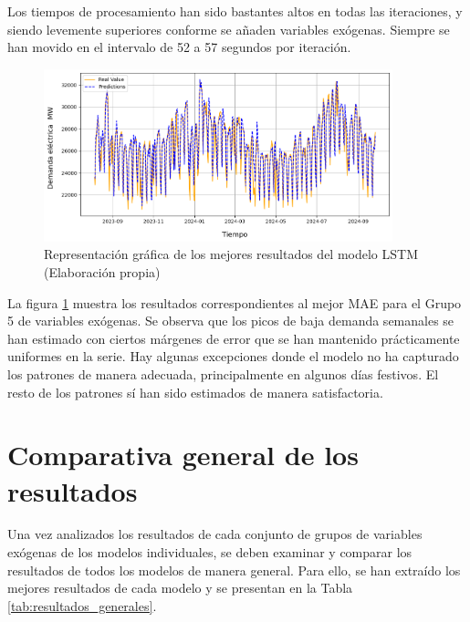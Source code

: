 \documentclass[12pt,a4paper]{report}
\begin{document}
Los tiempos de procesamiento han sido bastantes altos en todas las iteraciones, y siendo levemente superiores conforme se añaden variables exógenas. Siempre se han movido en el intervalo de 52 a 57 segundos por iteración.



\begin{figure}[H]
    \centering
    \includegraphics[width=0.9\textwidth]{Images/tfm-4.5(lstm).png}
    \caption{Representación gráfica de los mejores resultados del modelo LSTM (Elaboración propia) }
    \label{fig:figura_LSTM}
\end{figure}


La figura \ref{fig:figura_LSTM} muestra los resultados correspondientes al mejor MAE para el Grupo 5 de variables exógenas. Se observa que los picos de baja demanda semanales se han estimado con ciertos márgenes de error que se han mantenido prácticamente uniformes en la serie. Hay algunas excepciones donde el modelo no ha capturado los patrones de manera adecuada, principalmente en algunos días festivos. El resto de los patrones sí han sido estimados de manera satisfactoria.









\section{Comparativa general de los resultados}

Una vez analizados los resultados de cada conjunto de grupos de variables exógenas de los modelos individuales, se deben examinar y comparar los resultados de todos los modelos de manera general. Para ello, se han extraído los mejores resultados de cada modelo y se presentan en la Tabla \ref{tab:resultados_generales}.
\end{document}
